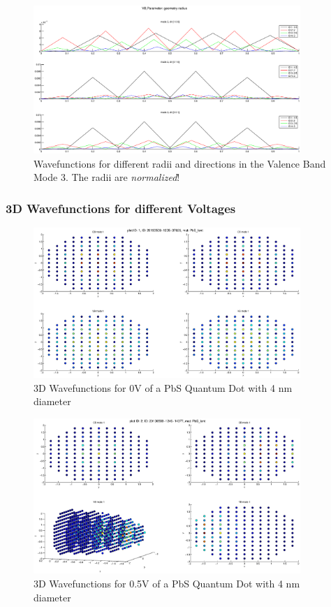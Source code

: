 \documentclass[a4paper, 11pt, landscape]{article}
\begin{document}
			\newpage
			\begin{figure}[htbp]
			  \centering
				\includegraphics[width=0.9\textwidth]{figures/EVPlot3AxesMod3.eps}
				\caption{Wavefunctions for different radii and directions in the Valence Band Mode 3. The radii are {\it normalized}!}
			\end{figure}
			
			\newpage
			\subsubsection*{3D Wavefunctions for different Voltages}
				\begin{figure}[htbp]
					\centering
					\includegraphics[width=0.9\textwidth]{figures/EVPlot3DVolt1.eps}
					\caption{3D Wavefunctions for 0V of a PbS Quantum Dot with 4 nm  diameter}
				\end{figure}
				\newpage
				\begin{figure}[htbp]
					\centering
					\includegraphics[width=0.9\textwidth]{figures/EVPlot3DVolt6.eps}
					\caption{3D Wavefunctions for 0.5V of a PbS Quantum Dot with 4 nm  diameter}
				\end{figure}
\end{document}
